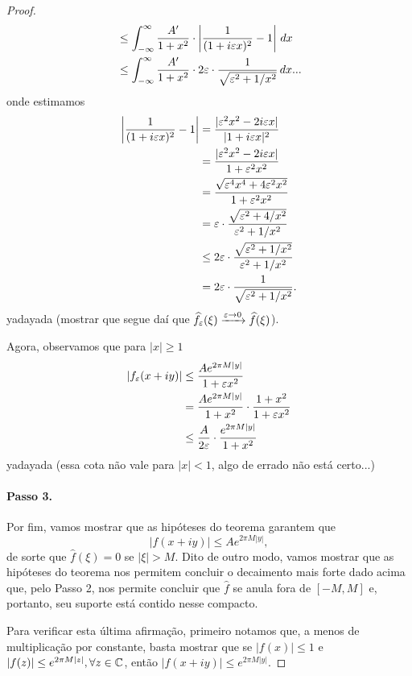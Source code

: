 \begin{proof}
\begin{align*}
                &\leq \int_{-\infty}^{\infty} \frac{A'}{1+x^2}\cdot\left|\frac{1}{(1+i\varepsilon x)^2} - 1\right| \, dx \\
                &\leq \int_{-\infty}^{\infty} \frac{A'}{1+x^2}\cdot 2\varepsilon\cdot\frac{1}{\sqrt{\varepsilon^2 + 1/x^2}} \, dx ...
            \end{align*}
            onde estimamos
            \begin{align*}
                \left| \frac{1}{(1+i\varepsilon x)^2} - 1 \right| &= \frac{|\varepsilon^2x^2 - 2i\varepsilon x|}{|1+i\varepsilon x|^2} \\
                                                         &= \frac{|\varepsilon^2x^2 - 2i\varepsilon x|}{1+\varepsilon^2x^2} \\
                                                         &= \frac{\sqrt{\varepsilon^4x^4 + 4\varepsilon^2x^2}}{1+\varepsilon^2x^2} \\
                                                         &= \varepsilon\cdot\frac{\sqrt{\varepsilon^2 + 4/x^2}}{\varepsilon^2 + 1/x^2} \\
                                                         &\leq 2\varepsilon\cdot\frac{\sqrt{\varepsilon^2 + 1/x^2}}{\varepsilon^2 + 1/x^2} \\
                                                         &= 2\varepsilon\cdot\frac{1}{\sqrt{\varepsilon^2 + 1/x^2}}.
            \end{align*}
            yadayada (mostrar que segue daí que $\widehat{f_{\varepsilon}}(\xi) \xrightarrow{\varepsilon\to 0} \widehat{f}(\xi)$).
            
            Agora, observamos que para $|x|\geq 1$
            \begin{align*}
                |f_{\varepsilon}(x+iy)| &\leq \frac{Ae^{2\pi M|y|}}{1 + \varepsilon x^2} \\
                               &= \frac{Ae^{2\pi M|y|}}{1+x^2}\cdot\frac{1+x^2}{1 + \varepsilon x^2} \\
                               &\leq \frac{A}{2\varepsilon}\cdot\frac{e^{2\pi M|y|}}{1+x^2}
            \end{align*}
            yadayada (essa cota não vale para $|x| < 1$, algo de errado não está certo...)
            \paragraph{Passo 3.} Por fim, vamos mostrar que as hipóteses
            do teorema garantem que
            \begin{equation*}
                |f(x+iy)| \leq Ae^{2\pi M|y|},
            \end{equation*}
            de sorte que $\widehat{f}(\xi) = 0$ se $|\xi| > M$. Dito
            de outro modo, vamos mostrar que as hipóteses do teorema
            nos permitem concluir o decaimento mais forte dado acima
            que, pelo Passo 2, nos permite concluir que $\widehat{f}$
            se anula fora de $[-M,M]$ e, portanto, seu suporte está
            contido nesse compacto.
            
            Para verificar esta última afirmação, primeiro notamos que,
            a menos de multiplicação por constante, basta mostrar que se
            $|f(x)| \leq 1$ e $|f(z)| \leq e^{2\pi M|z|}, \forall z\in\mathbb{C}$,
            então $|f(x+iy)| \leq e^{2\pi M|y|}$.
        \end{proof}
